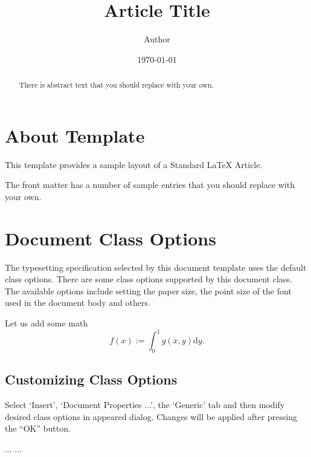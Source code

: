 \documentclass{article}
\begin{document}
\title{Article Title}
\author{Author}
\date{\today}
\maketitle

\begin{abstract}
    There is abstract text that you should replace with your own.
\end{abstract}


\section{About Template}
This template provides a sample layout of a Standard \LaTeX{} Article.

The front matter has a number of sample entries that you should replace
with your own. 

\section{Document Class Options}
The typesetting specification selected by this document template
uses the default class options. There are some class options 
supported by this document class. The available options include 
setting the paper size, the point size of the font used in the 
document body and others.

Let us add some math
$$f(x):=\int_0^1 g(x,y)\mathrm{d}y.$$

\subsection{Customizing Class Options}
Select `Insert', `Document Properties ...', the `Generic' tab
and then modify desired class options in appeared dialog.
Changes will be applied after pressing the ``OK'' button.

\begin{thebibliography}{99}
 ...
 ...
\end{thebibliography}
\end{document}
